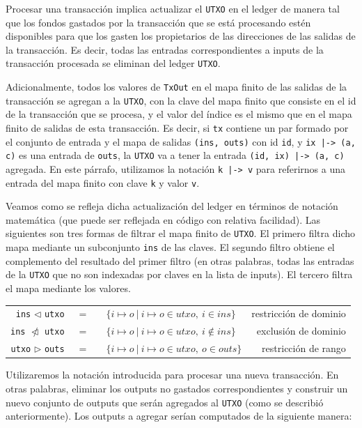 \documentclass[12pt]{book}
\begin{document}
Procesar una transacción implica actualizar el \texttt{UTXO} en el ledger de manera tal que los fondos gastados por la transacción que se está procesando estén disponibles para que los gasten los propietarios de las direcciones de las salidas de la transacción. Es decir, todas las entradas correspondientes a inputs de la transacción procesada se eliminan del ledger \texttt{UTXO}.

Adicionalmente, todos los valores de \texttt{TxOut} en el mapa finito de las salidas de la transacción se agregan a la \texttt{UTXO}, con la clave del mapa finito que consiste en el id de la transacción que se procesa, y el valor del índice es el mismo que en el mapa finito de salidas de esta transacción. Es decir, si \texttt{tx} contiene un par formado por el conjunto de entrada y el mapa de salidas \texttt{(ins, outs)} con id \texttt{id}, y \texttt{ix |-> (a, c)} es una entrada de \texttt{outs}, la \texttt{UTXO} va a tener la entrada \texttt{(id, ix) |-> (a, c)} agregada. En este párrafo, utilizamos la notación \texttt{k |-> v} para referirnos a una entrada del mapa finito con clave \texttt{k} y valor \texttt{v}.

Veamos como se refleja dicha actualización del ledger en términos de notación matemática (que puede ser reflejada en código con relativa facilidad). Las siguientes son tres formas de filtrar el mapa finito de \texttt{UTXO}. El primero filtra dicho mapa mediante un subconjunto \texttt{ins} de las claves. El segundo filtro obtiene el complemento del resultado del primer filtro (en otras palabras, todas las entradas de la \texttt{UTXO} que no son indexadas por claves en la lista de inputs). El tercero filtra el mapa mediante los valores.

\begin{center}
	\begin{tabular}{ r @{} c @{} l r }
		\texttt{ins} $\lhd$ \texttt{utxo}           & \ =\ \  & $\{ i \mapsto o\ |\ i \mapsto o \in utxo,\ i \in ins \}$    & restricción de dominio \\
		\texttt{ins} $\ntriangleleft$ \texttt{utxo} & \ =\ \  & $\{ i \mapsto o\ |\ i \mapsto o \in utxo,\ i \notin ins \}$ & exclusión de dominio   \\
		\texttt{utxo} $\rhd$ \texttt{outs}          & \ =\ \  & $\{ i \mapsto o\ |\ i \mapsto o \in utxo,\ o \in outs \}$   & restricción de rango
	\end{tabular}
\end{center}

Utilizaremos la notación introducida para procesar una nueva transacción. En otras palabras, eliminar los outputs no gastados correspondientes y construir un nuevo conjunto de outputs que serán agregados al \texttt{UTXO} (como se describió anteriormente). Los outputs a agregar serían computados de la siguiente manera:
\end{document}
